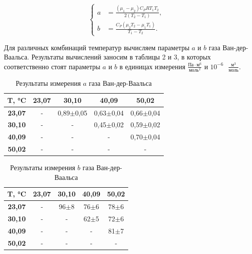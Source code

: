 \documentclass[12pt,a4paper]{article}
\begin{document}
\[ \left\{ \begin{aligned}
	 a &= \frac{\left(\mu_1 - \mu_2\right)C_PRT_1T_2}{2\left(T_2-T_1\right)}, \\
	b &= \frac{C_P(\mu_2T_2-\mu_1T_1)}{T_1-T_2}. \end{aligned} \right. \]

Для различных комбинаций температур  вычисляем параметры $a$ и $b$ газа Ван-дер-Ваальса. Результаты вычислений заносим в таблицы 2 и 3, в которых соответственно стоят  параметры $a$ и $b$ в единицах измерения $\displaystyle \frac{\text{Па}\cdot\text{м}^6}{\text{моль}^2} $  и $10^{-6}$$\displaystyle\text{ }\frac{\text{м}^3}{\text{моль}}$. 


\begin{table}[h!]
\centering
\begin{tabular}{|c|c|c|c|c|}
\hline
\textbf{T, °C} & \textbf{23,07} & \textbf{30,10} & \textbf{40,09} & \textbf{50,02} \\ \hline
\textbf{23,07} & -              & 0,89$\pm$0,05     & 0,63$\pm$0,04     & 0,66$\pm$0,04     \\ \hline
\textbf{30,10} & -              & -              & 0,45$\pm$0,02     & 0,59$\pm$0,02     \\ \hline
\textbf{40,09} & -              & -              & -              & 0,70$\pm$0,04     \\ \hline
\textbf{50,02} & -              & -              & -              & -              \\ \hline
\end{tabular}
	\caption{Результаты измерения $a$ газа Ван-дер-Ваальса}
\end{table}

\begin{table}[h!]
\centering
\begin{tabular}{|c|c|c|c|c|}
\hline
\textbf{T, °C} & \textbf{23,07} & \textbf{30,10} & \textbf{40,09} & \textbf{50,02} \\ \hline
\textbf{23,07} & -              & 96$\pm$8          & 76$\pm$6          & 78$\pm$6          \\ \hline
\textbf{30,10} & -              & -              & 62$\pm$5          & 72$\pm$6          \\ \hline
\textbf{40,09} & -              & -              & -              & 81$\pm$7          \\ \hline
\textbf{50,02} & -              & -              & -              & -              \\ \hline
\end{tabular}
	\caption{Результаты измерения $b$ газа Ван-дер-Ваальса}

\end{table}
\end{document}
